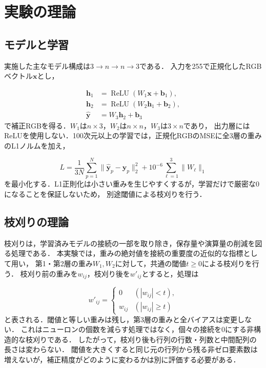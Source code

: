 \documentclass[a4paper,11pt]{article}
\begin{document}
\section{実験の理論}
\subsection{モデルと学習}

実施した主なモデル構成は$3\to n\to n\to3$である．
入力を255で正規化したRGBベクトル$\boldsymbol{x}$とし，

\begin{align}
    \boldsymbol{h}_1&=\operatorname{ReLU}(W_1\boldsymbol{x}+\boldsymbol{b}_1),\\
    \boldsymbol{h}_2&=\operatorname{ReLU}(W_2\boldsymbol{h}_1+\boldsymbol{b}_2),\\
    \hat{\boldsymbol{y}}&=W_3\boldsymbol{h}_2+\boldsymbol{b}_3
\end{align}
%
で補正RGBを得る．$W_1$は$n\times3$，$W_2$は$n\times n$，$W_3$は$3\times n$であり，
出力層にはReLUを使用しない．100次元以上の学習では，正規化RGBのMSEに全3層の重みのL1ノルムを加え，

\[
    L=\frac{1}{3N}\sum_{p=1}^{N}\|\hat{\boldsymbol{y}}_p-\boldsymbol{y}_p\|_2^2
    +10^{-6}\sum_{\ell=1}^{3}\|W_\ell\|_1
\]
%
を最小化する．L1正則化は小さい重みを生じやすくするが，学習だけで厳密な0になることを保証しないため，
別途閾値による枝刈りを行う．

\Needspace{65mm}
\subsection{枝刈りの理論}\label{sec:pruning-theory}

枝刈りは，学習済みモデルの接続の一部を取り除き，保存量や演算量の削減を図る処理である\cite{han}．
本実験では，重みの絶対値を接続の重要度の近似的な指標として用い，
第1・第2層の重み$W_1,W_2$に対して，共通の閾値$t\geq0$による枝刈りを行う．
枝刈り前の重みを$w_{ij}$，枝刈り後を$w'_{ij}$とすると，処理は

\[
    w'_{ij}=\begin{cases}
        0&(|w_{ij}|<t),\\
        w_{ij}&(|w_{ij}|\geq t)
    \end{cases}
\]
%
と表される．閾値と等しい重みは残し，第3層の重みと全バイアスは変更しない．
これはニューロンの個数を減らす処理ではなく，個々の接続を0にする非構造的な枝刈りである．
したがって，枝刈り後も行列の行数・列数と中間配列の長さは変わらない．
閾値を大きくすると同じ元の行列から残る非ゼロ要素数は増えないが，補正精度がどのように変わるかは別に評価する必要がある．
\end{document}
